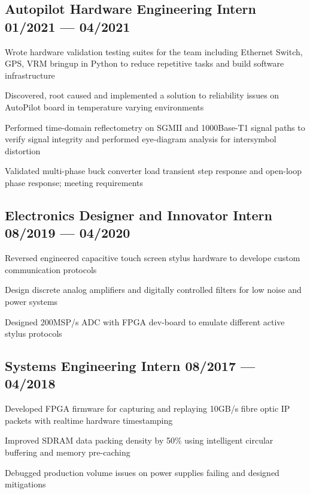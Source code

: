 \documentclass[letter,9pt]{article}
\begin{document}
\subsection{{Autopilot Hardware Engineering Intern \hfill 01/2021 --- 04/2021}}
\begin{zitemize}
\item Wrote hardware validation testing suites for the team including Ethernet Switch, GPS, VRM bringup in Python to reduce repetitive tasks and build software infrastructure
\item Discovered, root caused and implemented a solution to reliability issues on AutoPilot board in temperature varying environments
\item Performed time-domain reflectometry on SGMII and 1000Base-T1 signal paths to verify signal integrity and performed eye-diagram analysis for intersymbol distortion
\item Validated multi-phase buck converter load transient step response and open-loop phase response; meeting requirements
\end{zitemize}
{\color{sectiondivide} \vspace{-0.75em}\hrulefill}

\subsection{{Electronics Designer and Innovator Intern \hfill 08/2019 --- 04/2020}}
\begin{zitemize}
\item Reversed engineered capacitive touch screen stylus hardware to develope custom communication protocols
\item Design discrete analog amplifiers and digitally controlled filters for low noise and power systems
\item Designed 200MSP/s ADC with FPGA dev-board to emulate different active stylus protocols
\end{zitemize}
{\color{sectiondivide} \vspace{-0.75em}\hrulefill}

\subsection{{Systems Engineering Intern \hfill 08/2017 --- 04/2018}}
\begin{zitemize}
\item Developed FPGA firmware for capturing and replaying 10GB/s fibre optic IP packets with realtime hardware timestamping
\item Improved SDRAM data packing density by 50\% using intelligent circular buffering and memory pre-caching
\item Debugged production volume issues on power supplies failing and designed mitigations
\end{zitemize}
\end{document}
